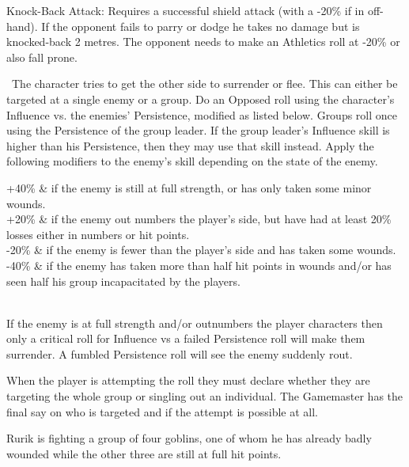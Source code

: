 \begin{description}
\begin{rpg-list}
		\item Knock-Back Attack: Requires a successful shield attack (with a -20\% if in off-hand). If the opponent fails to parry or dodge he takes no damage but is knocked-back 2 metres. The opponent needs to make an Athletics roll at -20\% or also fall prone.
		\end{rpg-list}
	\item[Intimidate/Persuade:]  The character tries to get the other side to surrender or flee. This can either be targeted at a single enemy or a group.  Do an Opposed roll using the character’s Influence vs. the enemies’ Persistence, modified as listed below. Groups roll once using the Persistence of the group leader. If the group leader’s Influence skill is higher than his Persistence, then they may use that skill instead. Apply the following modifiers to the enemy’s skill depending on the state of the enemy.
	\begin{rpg-table}[|c|X|]
		\hline
		+40\% & if the enemy is still at full strength, or has only taken some minor wounds.\\
		+20\% & if the enemy out numbers the player’s side, but have had at least 20\% losses either in numbers or hit points.\\
		-20\% & if the enemy is fewer than the player’s side and has taken some wounds.\\
		-40\% & if the enemy has taken more than half hit points in wounds and/or has seen half his group incapacitated by the players.\\
		\hline
		\\
		\hline
	\end{rpg-table}

If the enemy is at full strength and/or outnumbers the player characters then only a critical roll for Influence vs a failed Persistence roll will make them surrender. A fumbled Persistence roll will see the enemy suddenly rout.

When the player is attempting the roll they must declare whether they are targeting the whole group or singling out an individual. The Gamemaster has the final say on who is targeted and if the attempt is possible at all. 

	\begin{rpg-examplebox}
Rurik is fighting a group of four goblins, one of whom he has already badly wounded while the other three are still at full hit points. 


\end{rpg-examplebox}
\end{description}
